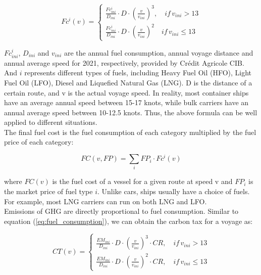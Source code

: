 \documentclass[a4paper,12pt]{article}
\begin{document}
\begin{equation}
	\label{eq:fuel_consumption}
	Fc^i(v) =
	\left\{
	\begin{aligned}
		\frac{Fc^i_{ini}}{D_{ini}} \cdot D \cdot (\frac{v}{v_{ini}})^3, \quad if \, v_{ini} > 13 \\
		\frac{Fc^i_{ini}}{D_{ini}} \cdot D \cdot (\frac{v}{v_{ini}})^2 \quad if \, v_{ini} \leq 13
	\end{aligned}
	\right.
\end{equation}

$Fc^i_{ini}$, $D_{ini}$ and $v_{ini}$ are the annual fuel consumption, annual voyage distance and annual average speed for 2021, respectively, provided by Crédit Agricole CIB.
And $i$ represents different types of fuels, including Heavy Fuel Oil (HFO), Light Fuel Oil (LFO), Diesel and Liquefied Natural Gas (LNG). D is the distance of a certain route, and v is the actual voyage speed.
In reality, most container ships have an average annual speed between 15-17 knots, while bulk carriers have an annual average speed between 10-12.5 knots.
Thus, the above formula can be well applied to different situations.\\

The final fuel cost is the fuel consumption of each category multiplied by the fuel price of each category:

\begin{equation}
	\label{eq:fuel_cost}
	FC(v, FP) = \sum_i FP_i \cdot Fc^i(v)
\end{equation}

where $FC(v)$ is the fuel cost of a vessel for a given route at speed v and $FP_i$ is the market price of fuel type $i$. Unlike cars, ships usually have a choice of fuels. For example, most LNG carriers can run on both LNG and LFO.\\

Emissions of GHG are directly proportional to fuel consumption.
Similar to equation (\ref{eq:fuel_consumption}), we can obtain the carbon tax for a voyage as:

\begin{equation}
	\label{eq:emission}
	CT(v) =
	\left\{
	\begin{aligned}
		\frac{EM_{ini}}{D_{ini}} \cdot D \cdot (\frac{v}{v_{ini}})^3 \cdot CR, \quad if \, v_{ini} > 13 \\
		\frac{EM_{ini}}{D_{ini}} \cdot D \cdot (\frac{v}{v_{ini}})^2 \cdot CR, \quad if \, v_{ini} \leq 13
	\end{aligned}
	\right.
\end{equation}
\end{document}

